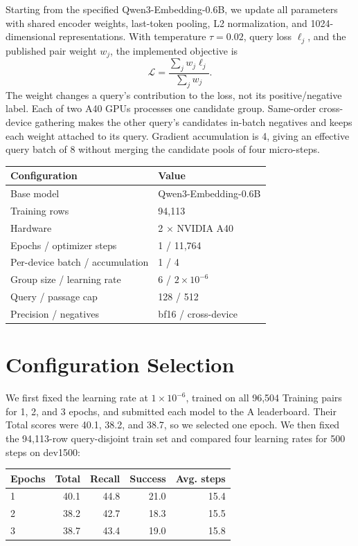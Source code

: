 \documentclass[10pt,a4paper]{article}
\begin{document}
Starting from the specified Qwen3-Embedding-0.6B, we update all parameters with shared encoder weights, last-token pooling, L2 normalization, and 1024-dimensional representations. With temperature $\tau=0.02$, query loss $\ell_j$, and the published pair weight $w_j$, the implemented objective is
\[
\mathcal{L}=\frac{\sum_j w_j\ell_j}{\sum_j w_j}.
\]
The weight changes a query's contribution to the loss, not its positive/negative label. Each of two A40 GPUs processes one candidate group. Same-order cross-device gathering makes the other query's candidates in-batch negatives and keeps each weight attached to its query. Gradient accumulation is 4, giving an effective query batch of 8 without merging the candidate pools of four micro-steps.

\begin{center}
\small
\begin{tabularx}{0.94\textwidth}{p{}Y}
\toprule
Configuration & Value \\
\midrule
Base model & Qwen3-Embedding-0.6B \\
Training rows & 94,113 \\
Hardware & 2 $\times$ NVIDIA A40 \\
Epochs / optimizer steps & 1 / 11,764 \\
Per-device batch / accumulation & 1 / 4 \\
Group size / learning rate & 6 / $2\times10^{-6}$ \\
Query / passage cap & 128 / 512 \\
Precision / negatives & bf16 / cross-device \\
\bottomrule
\end{tabularx}
\end{center}

\section{Configuration Selection}
We first fixed the learning rate at $1\times10^{-6}$, trained on all 96,504 Training pairs for 1, 2, and 3 epochs, and submitted each model to the A leaderboard. Their Total scores were 40.1, 38.2, and 38.7, so we selected one epoch. We then fixed the 94,113-row query-disjoint train set and compared four learning rates for 500 steps on dev1500:

\begin{center}
\small
\begin{tabular}{lrrrr}
\toprule
Epochs & Total & Recall & Success & Avg. steps \\
\midrule
1 & 40.1 & 44.8 & 21.0 & 15.4 \\
2 & 38.2 & 42.7 & 18.3 & 15.5 \\
3 & 38.7 & 43.4 & 19.0 & 15.8 \\
\bottomrule
\end{tabular}
\end{center}
\end{document}
